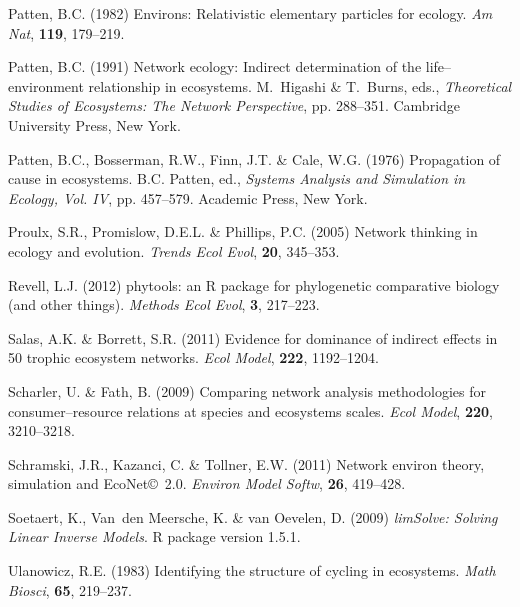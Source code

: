 \documentclass[11pt]{article}
\begin{document}
\begin{thebibliography}{75}
Patten, B.C. (1982) Environs: Relativistic elementary particles for ecology.
\newblock \emph{Am Nat}, \textbf{119}, 179--219.

Patten, B.C. (1991) Network ecology: Indirect determination of the
  life--environment relationship in ecosystems.
\newblock M.~Higashi \& T.~Burns, eds., \emph{Theoretical Studies of
  Ecosystems: The Network Perspective}, pp. 288--351. Cambridge University
  Press, New York.

Patten, B.C., Bosserman, R.W., Finn, J.T. \& Cale, W.G. (1976) Propagation of
  cause in ecosystems.
\newblock B.C. Patten, ed., \emph{Systems Analysis and Simulation in Ecology,
  Vol. IV}, pp. 457--579. Academic Press, New York.

Proulx, S.R., Promislow, D.E.L. \& Phillips, P.C. (2005) Network thinking in
  ecology and evolution.
\newblock \emph{Trends Ecol Evol}, \textbf{20}, 345--353.

Revell, L.J. (2012) phytools: an {R} package for phylogenetic comparative
  biology (and other things).
\newblock \emph{Methods Ecol Evol}, \textbf{3}, 217--223.

Salas, A.K. \& Borrett, S.R. (2011) Evidence for dominance of indirect effects
  in 50 trophic ecosystem networks.
\newblock \emph{Ecol Model}, \textbf{222}, 1192--1204.

Scharler, U. \& Fath, B. (2009) Comparing network analysis methodologies for
  consumer--resource relations at species and ecosystems scales.
\newblock \emph{Ecol Model}, \textbf{220}, 3210--3218.

Schramski, J.R., Kazanci, C. \& Tollner, E.W. (2011) Network environ theory,
  simulation and {EcoNet}\copyright\ 2.0.
\newblock \emph{Environ Model Softw}, \textbf{26}, 419--428.

Soetaert, K., Van~den Meersche, K. \& van Oevelen, D. (2009) \emph{limSolve:
  Solving Linear Inverse Models}.
\newblock R package version 1.5.1.

Ulanowicz, R.E. (1983) Identifying the structure of cycling in ecosystems.
\newblock \emph{Math Biosci}, \textbf{65}, 219--237.


\end{thebibliography}
\end{document}
